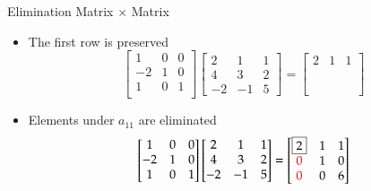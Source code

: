 \documentclass[10pt]{beamer}
\begin{document}

\begin{frame}{Elimination Matrix $\times$ Matrix}

    \begin{itemize}
        \item<1-> The first row is preserved 
        \[
        \begin{bmatrix}
          1 & 0 & 0\\
        -2 & 1 & 0\\
        1 & 0 & 1\\
        \end{bmatrix}
         \begin{bmatrix}2 &1&1\\ 4 &3&2\\ -2 &-1&5\end{bmatrix}  =
        \begin{bmatrix}
        2 & 1 & 1\\ \phantom0 &\phantom1 & \phantom1\\ \phantom0&\phantom0&\phantom6
        \end{bmatrix}
        \]
        \item<2-> Elements under $a_{11}$ are eliminated 
        \[
        \begin{bmatrix}
          1 & 0 & 0\\
        -2 & 1 & 0\\
        1 & 0 & 1\\
        \end{bmatrix}
         \begin{bmatrix}2 &1&1\\ 4 &3&2\\ -2 &-1&5\end{bmatrix}  =
        \begin{bmatrix}
        \boxed{2} &1 & 1\\ \textcolor{red}{0} &1 & 0\\ \textcolor{red}{0} &0&6
        \end{bmatrix}
        \]
    \end{itemize}
\end{frame}
\end{document}
